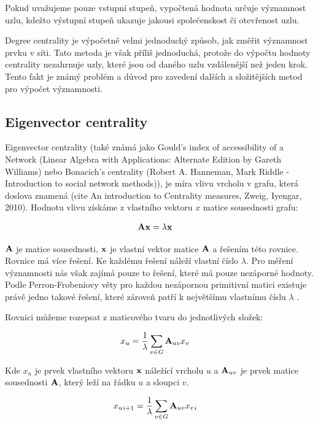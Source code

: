 \documentclass[12pt,titlepage]{report}
\begin{document}
Pokud uvažujeme pouze vstupní stupeň, vypočtená hodnota určuje významnost uzlu,
kdežto výstupní stupeň ukazuje jakousi společenskost či otevřenost uzlu. 

Degree centrality je výpočetně velmi jednoduchý způsob, jak změřit významnost
prvku v síti. Tato metoda je však příliš jednoduchá, protože do výpočtu hodnoty
centrality nezahrnuje uzly, které jsou od daného uzlu vzdálenější než jeden
krok. Tento fakt je známý problém a důvod pro zavedení dalších a složitějších
metod pro výpočet významnosti.



\subsection{Eigenvector centrality}
Eigenvector centrality (také známá jako Gould's index of accessibility of a
Network (Linear Algebra with Applications: Alternate Edition by Gareth
Williams) nebo Bonacich's centrality (Robert A. Hanneman, Mark Riddle -
Introduction to social network methods)), je míra vlivu vrcholu v grafu, která
doslova znamená  (cite An introduction to
Centrality measures, Zweig, Iyengar, 2010). Hodnotu vlivu získáme z vlastního
vektoru $x$ matice sousednosti grafu:

\begin{align}
{\bf Ax} &= \lambda {\bf x}
\end{align}

${\bf A}$ je matice sousednosti, ${\bf x}$ je vlastní vektor matice ${\bf A}$ a
řešením této rovnice. Rovnice má více řešení. Ke každému řešení náleží vlastní
číslo $\lambda$. Pro měření významnosti nás však zajímá pouze to řešení, které
má pouze nezáporné hodnoty. Podle Perron-Frobeniovy věty pro každou nezápornou
primitivní matici existuje právě jedno takové řešení, které zároveň patří k
největšímu vlastnímu číslu $\lambda$ \cite{langvillemeyer}.

Rovnici můžeme rozepsat z maticového tvaru do jednotlivých složek:

\begin{align} 
x_u &=  \frac{1}{\lambda} \displaystyle\sum_{v \in G} {\bf A}_{uv} x_v 
\end{align} 

Kde $x_u$ je prvek vlastního vektoru ${\bf x}$
náležící vrcholu $u$ a ${\bf A}_{uv}$ je prvek matice sousednosti ${\bf A}$,
který leží na řádku $u$ a sloupci $v$.

\begin{align} 
{x_u}_{i + 1} &=  \frac{1}{\lambda} \displaystyle\sum_{v \in G} {\bf A}_{uv}
{x_v}_{i}
\end{align} 
\end{document}
